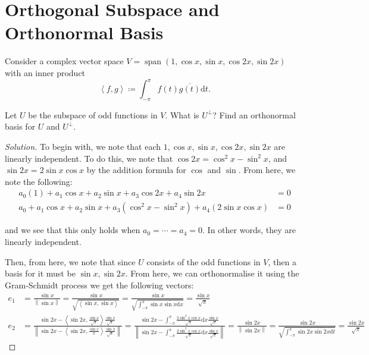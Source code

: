 \documentclass{article}
\newenvironment{solution}{\begin{proof}[Solution]}{\end{proof}}
\newcommand{\norm}[1]{\left\lVert{#1}\right\rVert}
\DeclareMathOperator*{\vspan}{\mathrm{span}}
\newcommand{\innerproduct}[2]{\left\langle{#1}, {#2}\right\rangle}
\begin{document}
	\section{Orthogonal Subspace and Orthonormal Basis}
	\begin{hw}
		Consider a complex vector space $V = \vspan(1, \cos x, \sin x, \cos 2x, \sin 2x)$ with an inner product
		\begin{equation*}
			\innerproduct{f}{g} \coloneq \int_{-\pi}^{\pi} f(t) \overline{g(t)} \mathrm dt.
		\end{equation*}
	
		Let $U$ be the subspace of odd functions in $V$. What is $U^{\perp}$? Find an orthonormal basis for $U$ and $U^{\perp}$.
	\end{hw}
	\begin{solution}
		To begin with, we note that each $1, \cos x, \sin x, \cos 2x, \sin 2x$ are linearly independent. To do this, we note that $\cos 2x = \cos^{2} x - \sin^{2} x$, and $\sin 2x = 2\sin x \cos x$ by the addition formula for $\cos$ and $\sin$. From here, we note the following:
		\begin{align*}
			a_{0}(1) + a_{1}\cos x + a_{2} \sin x + a_{3}\cos 2x + a_{4}\sin 2x &= 0 \\
			a_{0} + a_{1}\cos x + a_{2}\sin x + a_{3}(\cos^{2} x - \sin^{2} x) + a_{4}(2\sin x \cos x) &= 0
		\end{align*}
	
		and we see that this only holds when $a_{0} = \cdots = a_{4} = 0$. In other words, they are linearly independent.
		
		Then, from here, we note that since $U$ consists of the odd functions in $V$, then a basis for it must be $\sin x, \sin 2x$. From here, we can orthonormalise it using the Gram-Schmidt process we get the following vectors:
		\begin{align*}
			e_{1} &= \frac{\sin x}{\norm{\sin x}} = \frac{\sin x}{\sqrt{\innerproduct{\sin x}{\sin x}}} = \frac{\sin x}{\sqrt{\int_{-\pi}^{\pi} \sin x \overline{\sin x} \mathrm dx}} = \frac{\sin x}{\sqrt \pi} \\
			e_{2} &= \frac{\sin 2x - \innerproduct{\sin 2x}{\frac{\sin x}{\sqrt{\pi}}} \frac{\sin x}{\sqrt \pi}}{\norm{\sin 2x - \innerproduct{\sin 2x}{\frac{\sin x}{\pi}}\frac{\sin x}{\sqrt{\pi}}}} = \frac{\sin 2x - \int_{-\pi}^{\pi} \frac{2\sin^{2} x \cos x}{\sqrt{\pi}} \mathrm dx \frac{\sin x}{\sqrt \pi}}{\norm{\sin 2x - \int_{-\pi}^{\pi} \frac{2\sin^{2} x \cos x}{\sqrt{\pi}} \mathrm dx \frac{\sin x}{\sqrt \pi}}} = \frac{\sin 2x}{\norm{\sin 2x}} = \frac{\sin 2x }{\sqrt{\int_{-\pi}^{\pi} \sin 2x \overline{\sin 2x} \mathrm dt}} = \frac{\sin 2x}{\sqrt \pi}
		\end{align*} 
	

\end{solution}
\end{document}
